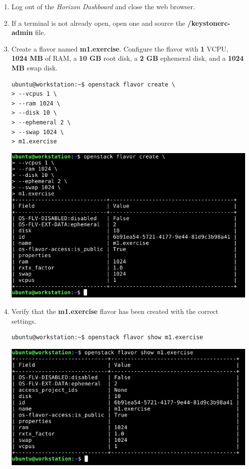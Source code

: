\documentclass[letterpaper, 12pt]{article}
\begin{document}
\begin{enumerate}
    \item Log out of the \textit{Horizon Dashboard} and close the web browser.
    
    \item If a terminal is not already open, open one and source the \textbf{\texttildemid/keystonerc-admin} file.

    \item Create a flavor named \textbf{m1.exercise}. Configure the flavor with \textbf{1} VCPU, \textbf{1024 MB} of RAM, a
    \textbf{10 GB} root disk, a \textbf{2 GB} ephemeral disk, and a \textbf{1024 MB} swap disk.
\begin{lstlisting}
ubuntu@workstation:~$ openstack flavor create \
> --vcpus 1 \
> --ram 1024 \
> --disk 10 \
> --ephemeral 2 \
> --swap 1024 \
> m1.exercise
\end{lstlisting}

    \begin{center}
        \includegraphics[width=\linewidth]{images/part2/step6.png}
    \end{center}

    \item Verify that the \textbf{m1.exercise} flavor has been created with the correct settings.
\begin{lstlisting}
ubuntu@workstation:~$ openstack flavor show m1.exercise
\end{lstlisting}

    \begin{center}
        \includegraphics[width=\linewidth]{images/part2/step7.png}
    \end{center}


\end{enumerate}
\end{document}
